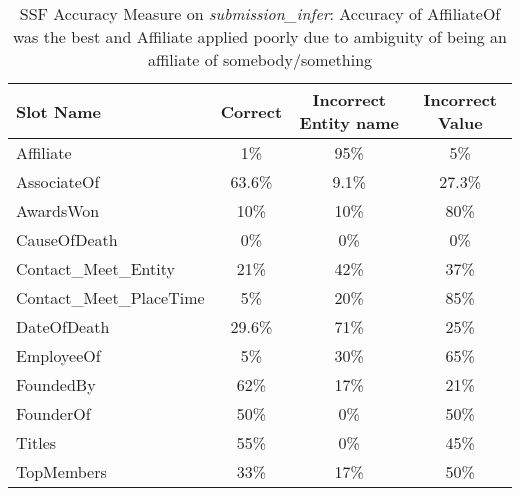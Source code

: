 \begin{table*}
\caption{SSF Accuracy Measure on \textit{submission\_infer}: Accuracy of AffiliateOf was the best and Affiliate applied poorly due to ambiguity of being an affiliate of somebody/something}
\centering
\label{table:finalresultaccuracy}
\begin{tabular}{|l|c|c|c|}
\hline 
 \textbf{Slot Name}  & \textbf{Correct} & \textbf{Incorrect Entity name} & \textbf{Incorrect Value} \\ 
\hline 
Affiliate & 1\% & 95\% & 5\% \\ \hline 
AssociateOf & 63.6\% & 9.1\% & 27.3\%  \\ \hline 
AwardsWon & 10\% & 10\% & 80\%  \\ \hline 
CauseOfDeath & 0\% & 0\% & 0\%  \\ \hline 
Contact\_Meet\_Entity & 21\% & 42\% & 37\%  \\ \hline 
Contact\_Meet\_PlaceTime & 5\% & 20\% & 85\%  \\ \hline 
DateOfDeath & 29.6\% & 71\% & 25\%  \\ \hline 
EmployeeOf & 5\% & 30\% & 65\%  \\ \hline 
FoundedBy & 62\% & 17\% & 21\%  \\ \hline 
FounderOf & 50\% & 0\% & 50\%  \\ \hline 
Titles & 55\% & 0\% & 45\%  \\ \hline 
TopMembers & 33\% & 17\% & 50\%  \\ \hline 

\end{tabular} 
\end{table*}









